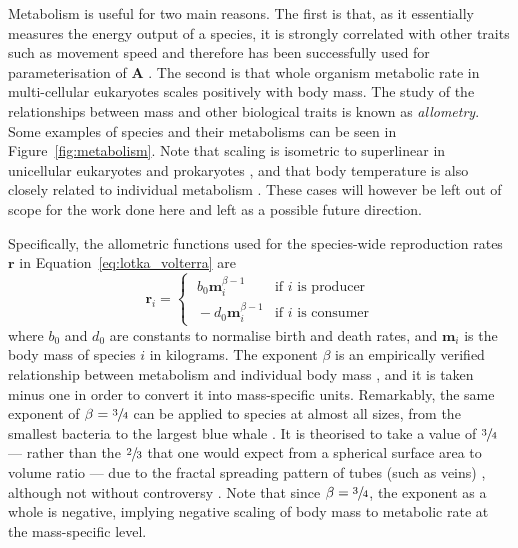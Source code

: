 Metabolism is useful for two main reasons. The first is that, as it essentially measures the energy output of a species, it is strongly correlated with other traits such as movement speed \citep{Hirt2017} and therefore has been successfully used for parameterisation of $\mathbf{A}$ \citep{Tang2014Correlation, Brose2006, Pawar2015}.
The second is that whole organism metabolic rate in multi-cellular eukaryotes scales positively with body mass.
The study of the relationships between mass and other biological traits is known as \emph{allometry}. Some examples of species and their metabolisms can be seen in Figure~\ref{fig:metabolism}.
Note that scaling is isometric to superlinear in unicellular eukaryotes and prokaryotes \citep{DeLong2010}, and that body temperature is also closely related to individual metabolism \citep{Savage2004}. These cases will however be left out of scope for the work done here and left as a possible future direction.

Specifically, the allometric functions used for the species-wide reproduction rates $\mathbf{r}$ in Equation~\eqref{eq:lotka_volterra} are
\begin{equation}
  \mathbf{r}_i =
  \begin{cases}
    \;b_0\mathbf{m}_i^{\beta-1} & \text{if $i$ is producer}\\
    \;-d_0\mathbf{m}_i^{\beta-1} & \text{if $i$ is consumer}
  \end{cases}
  \label{eq:metabolism_beta}
\end{equation}
where $b_0$ and $d_0$ are constants to normalise birth and death rates, and $\mathbf{m}_i$ is the body mass of species $i$ in kilograms. The exponent $\beta$ is an empirically verified relationship between metabolism and individual body mass \citep{Brown2004}, and it is taken minus one in order to convert it into mass-specific units.
Remarkably, the same exponent of $\beta=\sfrac{3}{4}$ can be applied to species at almost all sizes, from the smallest bacteria to the largest blue whale \citep{Kleiber1947}. It is theorised to take a value of $\sfrac{3}{4}$ --- rather than the $\sfrac{2}{3}$ that one would expect from a spherical surface area to volume ratio --- due to the fractal spreading pattern of tubes (such as veins) \citep{West1997}, although not without controversy \citep{Agutter2004}.
Note that since $\beta=\sfrac{3}{4}$, the exponent as a whole is negative, implying negative scaling of body mass to metabolic rate at the mass-specific level.

